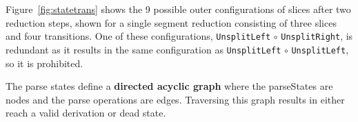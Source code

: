 \documentclass[12pt,a4paper,twoside,openany]{report} \usepackage[pdfborder={0 0 0}]{hyperref}    %
\theoremstyle{definition} \newtheorem{definition}{Definition}[section]
\begin{document}

    Figure~\ref{fig:statetrans} shows the 9 possible outer configurations of slices after two reduction steps, shown for
    a single segment reduction consisting of three slices and four transitions. One of these configurations,
    \texttt{UnsplitLeft} $\circ$ \texttt{UnsplitRight}, is redundant as it results in the same configuration as
    \texttt{UnsplitLeft} $\circ$ \texttt{UnsplitLeft}, so it is prohibited.


    The parse states define a \textbf{directed acyclic graph} where the parseStates are nodes and the parse operations
    are edges. Traversing this graph results in either reach a valid derivation or dead state. 


\end{document}
